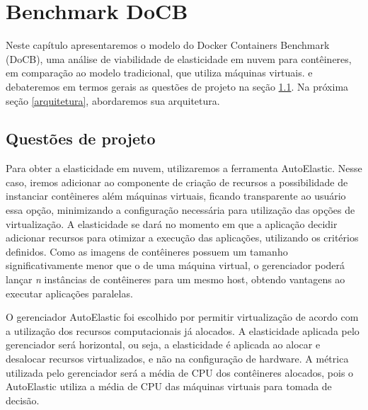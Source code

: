 \documentclass[twoside,english,brazilian]{UNISINOSartigo}
\begin{document}
\section{Benchmark DoCB}
\label{model}

Neste capítulo apresentaremos o modelo do Docker Containers Benchmark (DoCB), uma análise de viabilidade de elasticidade em nuvem para contêineres, em comparação ao modelo tradicional, que utiliza máquinas virtuais. e debateremos em termos gerais as questões de projeto na seção \ref{questao}. Na próxima seção \ref{arquitetura}, abordaremos sua arquitetura. 

\subsection{Questões de projeto}
\label{questao}

Para obter a elasticidade em nuvem, utilizaremos a ferramenta AutoElastic. Nesse caso, iremos adicionar ao componente de criação de recursos a possibilidade de instanciar contêineres além máquinas virtuais, ficando transparente ao usuário essa opção, minimizando a configuração necessária para utilização das opções de virtualização. A elasticidade se dará no momento em que a aplicação decidir adicionar recursos para otimizar a execução das aplicações, utilizando os critérios definidos. Como as imagens de contêineres possuem um tamanho significativamente menor que o de uma máquina virtual, o gerenciador poderá lançar \textit{n} instâncias de contêineres para um mesmo host, obtendo vantagens ao executar aplicações paralelas. 

O gerenciador AutoElastic foi escolhido por permitir virtualização de acordo com a utilização dos recursos computacionais já alocados. A elasticidade aplicada pelo gerenciador será horizontal, ou seja, a elasticidade é aplicada ao alocar e desalocar recursos virtualizados, e não na configuração de hardware. A métrica utilizada pelo gerenciador será a média de CPU dos contêineres alocados, pois o AutoElastic utiliza a média de CPU das máquinas virtuais para tomada de decisão.
\end{document}
